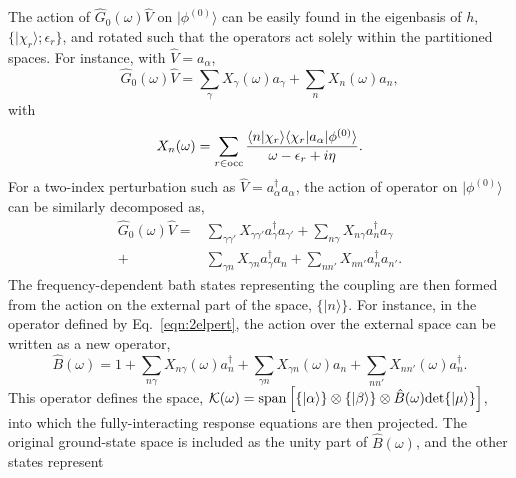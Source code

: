 \documentclass[aps,showpacs,twocolumn,nobibnotes]{revtex4}
\begin{document}
The action of ${\hat G_0}(\omega){\hat V}$ on $|\phi^{(0)} \rangle$ can be easily found in the eigenbasis of $h$, $\{ |\chi_r \rangle ; \epsilon_r \}$, 
and rotated such that the operators act solely within the partitioned spaces. For instance, with ${\hat V}=a_{\alpha}$, 
\begin{equation}
    {\hat G_0}(\omega){\hat V} = \sum_{\gamma} X_{\gamma}(\omega) a_{\gamma} + \sum_{n} X_{n}(\omega) a_n  ,
\end{equation}
with
\begin{equation}
    X_n(\omega) = \sum_{r \in \text{\textnormal {occ}}} \frac{\langle n|\chi_r \rangle \langle \chi_r | a_{\alpha} | \phi^{(0)} \rangle}{\omega - \epsilon_r + i \eta}   .
\end{equation}
For a two-index perturbation such as ${\hat V}=a_{\alpha}^{\dagger}a_{\alpha}$, the action of operator on $|\phi^{(0)} \rangle$ can be similarly decomposed as,
\begin{align}
    {\hat G_0}(\omega){\hat V} =& \sum_{\gamma \gamma'} X_{\gamma \gamma'} a_{\gamma}^{\dagger} a_{\gamma'} + \sum_{n \gamma} X_{n \gamma} a_n^{\dagger} a_{\gamma} \nonumber\\ 
                               +& \sum_{\gamma n} X_{\gamma n} a_{\gamma}^{\dagger} a_{n}  + \sum_{n n'} X_{n n'} a_n^{\dagger} a_{n'}    .   \label{eqn:2elpert}
\end{align}
The frequency-dependent bath states representing the coupling are then formed from the action on the external part of the space, $\{| n \rangle \}$. For instance, in the 
operator defined by Eq.~\ref{eqn:2elpert}, the action over the external space can be written as a new operator,
\begin{equation}
    {\hat B}(\omega) = 1 + \sum_{n \gamma} X_{n \gamma}(\omega) a_n^{\dagger} + \sum_{\gamma n} X_{\gamma n}(\omega) a_{n} + \sum_{n n'} X_{n n'}(\omega) a_n^{\dagger} .   \label{eqn:B}
\end{equation}
This operator defines the space, \mbox{$\mathcal{K}(\omega)=\text{\textnormal {span}} \left[ \{|\alpha \rangle \} \otimes \{ |\beta \rangle \} \otimes {\hat B}(\omega) \text{\textnormal {det}} \{ | \mu \rangle \} \right]$}, into which the fully-interacting 
response equations are then projected. The original ground-state space is included as the unity part of ${\hat B}(\omega)$, and the other states represent 
\end{document}
